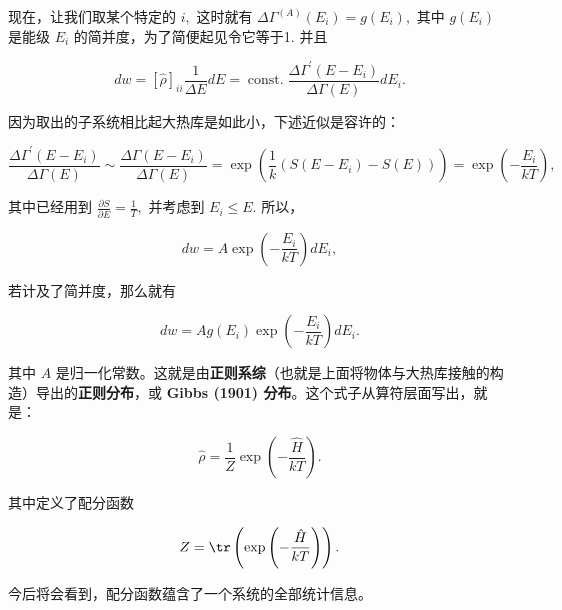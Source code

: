 现在，让我们取某个特定的 $i,$ 这时就有 $\Delta\Gamma^{\left( A \right)}(E_i) = g(E_i),$ 其中 $g(E_i)$ 是能级 $E_i$ 的简并度，为了简便起见令它等于1. 并且
\begin{linenomath}\begin{equation}
 dw = \left[ \hat{\rho} \right]_{ii} \frac{1}{\Delta E} dE = \operatorname{const.} \frac{\Delta\Gamma^{\prime}(E-E_i)}{\Delta\Gamma\left( E \right)} dE_i.
\end{equation}\end{linenomath}  
因为取出的子系统相比起大热库是如此小，下述近似是容许的：
\begin{linenomath}\begin{equation}
  \frac{\Delta\Gamma^{\prime}(E-E_i)}{\Delta\Gamma\left( E \right)} \sim \frac{\Delta\Gamma(E-E_i)}{\Delta\Gamma\left( E \right)} = \exp\left( \frac1k\left( S(E-E_i)-S(E) \right) \right) = \exp\left( -\frac{E_i}{kT} \right),
\end{equation}\end{linenomath}
其中已经用到 $\frac{\partial S}{\partial E} = \frac{1}{T},$ 并考虑到 $E_i \leq E.$ 所以，
\begin{linenomath}\begin{equation}
\boxed{dw = A\exp\left( -\frac{E_i}{kT}\right) dE_i} ,
\end{equation}\end{linenomath}
若计及了简并度，那么就有 \begin{linenomath}\begin{equation}dw = Ag\left( E_i \right) \exp\left( -\frac{E_i}{kT} \right) dE_i.\end{equation}\end{linenomath}
其中 $A$ 是归一化常数。这就是由\textbf{正则系综}（也就是上面将物体与大热库接触的构造）导出的\textbf{正则分布}，或 \textbf{Gibbs (1901) 分布}。这个式子从算符层面写出，就是：
\begin{linenomath}\begin{equation}
\hat{\rho} = \frac{1}{Z}\exp\left( -\frac{\hat{H}}{kT} \right).
\end{equation}\end{linenomath}

其中定义了配分函数 \begin{linenomath}\begin{equation}Z = \tr\left( \exp\left( -\frac{\hat{H}}{kT} \right) \right).\end{equation}\end{linenomath} 今后将会看到，配分函数蕴含了一个系统的全部统计信息。
